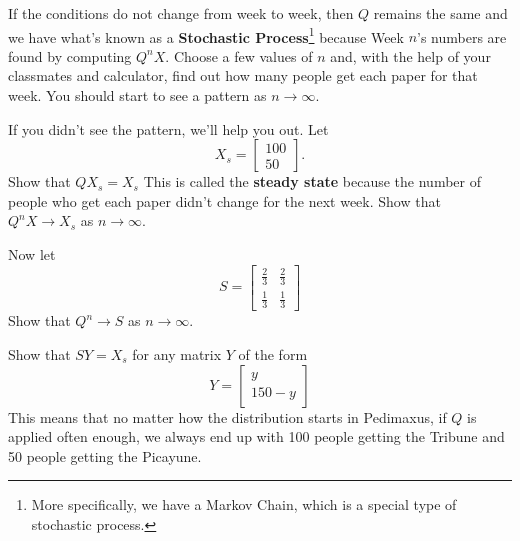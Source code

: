 \documentclass{ximera}
\begin{document}
\begin{question}
\begin{problem}
If the conditions do not change from week to week, then $Q$ remains the same and we have what's known as a   {\bf Stochastic Process}\footnote{More specifically, we have a Markov Chain, which is a special type of stochastic process.} because Week $n$'s numbers are found by computing $Q^{n}X$.  Choose a few values of $n$ and, with the help of your classmates and calculator, find out how many people get each paper for that week.  You should start to see a pattern as $n \rightarrow \infty$.
\end{problem}

\begin{problem}
If you didn't see the pattern, we'll help you out.  Let \[X_{s} = \left[ \begin{array}{r} 100 \\ 50 \end{array} \right].\]  Show that $QX_{s} = X_{s}$  This is called the {\bf steady state}  because the number of people who get each paper didn't change for the next week.  Show that $Q^{n}X \rightarrow X_{s}$ as $n \rightarrow \infty$. 
\end{problem}

\begin{problem}
Now let \[S = \left[ \begin{array}{rr} \frac{2}{3} & \frac{2}{3} \\   \frac{1}{3} & \frac{1}{3} \end{array} \right]\]  Show that $Q^{n} \rightarrow S$ as $n \rightarrow \infty$.
\end{problem}

\begin{problem}\label{MClast}
Show that $SY = X_{s}$ for any matrix $Y$ of the form \[Y = \left[ \begin{array}{r} y \\ 150 - y \end{array} \right]\] This means that no matter how the distribution starts in Pedimaxus, if $Q$ is applied often enough, we always end up with 100 people getting the Tribune and 50 people getting the Picayune.
\end{problem}  

\end{question}
\end{document}

